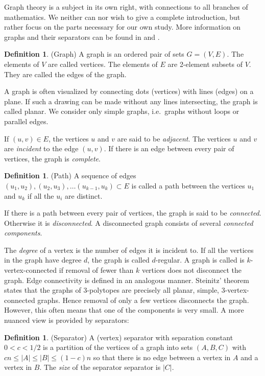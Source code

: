 \documentclass[a4paper,12pt]{book}
\theoremstyle{plain}
\theoremstyle{definition}
\newtheorem{definition}[theorem]{Definition}
\begin{document}
Graph theory is a subject in its own right, with connections to all branches 
of mathematics. We neither can nor wish to give a complete introduction, but
rather focus on the parts necessary for our own study. More information on graphs
and their separators can be found in \cite{spectra} and \cite{Rama}.

\begin{definition}
(Graph) A graph is an ordered pair of sets $G=(V,E)$. The elements of $V$ are called 
vertices. The elements of $E$ are 2-element subsets of $V$. They are called 
the edges of the graph. 
\end{definition}
A graph is often visualized by connecting dots (vertices) with lines (edges) on a plane. 
If such a drawing can be made without any lines intersecting, the graph is called
planar.
We consider only simple graphs, i.e.\ graphs without loops or parallel 
edges.

If $(u,v) \in E$, the vertices $u$ and $v$ are said to be \textit{adjacent}. 
The vertices $u$ and $v$ are \textit{incident} to the edge $(u,v)$. If there is an edge
between every pair of vertices, the graph is \textit{complete}.
\begin{definition}
 (Path) A sequence of edges $(u_1, u_2), (u_2, u_3), \dots (u_{k-1}, u_k) \subset E$ 
is called a path between the vertices $u_1$ and $u_k$ if all the $u_i$ are 
distinct.
\end{definition}
If there is a path between every pair of vertices, the graph is said to be 
\textit{connected}. Otherwise it is \textit{disconnected}. A disconnected graph 
consists of several \textit{connected components}.

The \textit{degree} of a vertex is the number of edges it is incident to. 
If all the vertices in the graph have degree $d$, the graph is called 
$d$-regular. A graph is called is $k$-vertex-connected if removal of fewer than 
$k$ vertices does not disconnect the graph. Edge connectivity is defined in an 
analogous manner. Steinitz' theorem states that the graphs of 
3-polytopes are precisely all planar, simple, 3-vertex-connected graphs. Hence 
removal of only a few vertices disconnects the graph. However, this
often means that one of the components is very small. A more nuanced view is 
provided 
by separators:

\begin{definition}
(Separator) A (vertex) separator with separation constant $0<c<1/2$ is a 
partition of the vertices of a graph into 
sets $(A,B,C)$  with $cn \le |A| \le |B| \le (1-c)n$ so that there is no edge between 
a vertex in $A$ and a vertex in $B$. The \textit{size} of the separator
separator is $|C|$.  
\end{definition}
\end{document}
